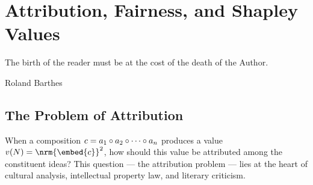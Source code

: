 \begin{center}
\end{center}



\chapter{Attribution, Fairness, and Shapley Values}
\label{ch:shapley}

\epigraph{The birth of the reader must be at the cost of the death of the
Author.}{Roland Barthes}

\section{The Problem of Attribution}

When a composition $c = a_1 \circ a_2 \circ \cdots \circ a_n$
produces a value $v(N) = \nrm{\embed{c}}^2$, how should this value be
attributed among the constituent ideas?  This question --- the attribution
problem --- lies at the heart of cultural analysis, intellectual property
law, and literary criticism.

